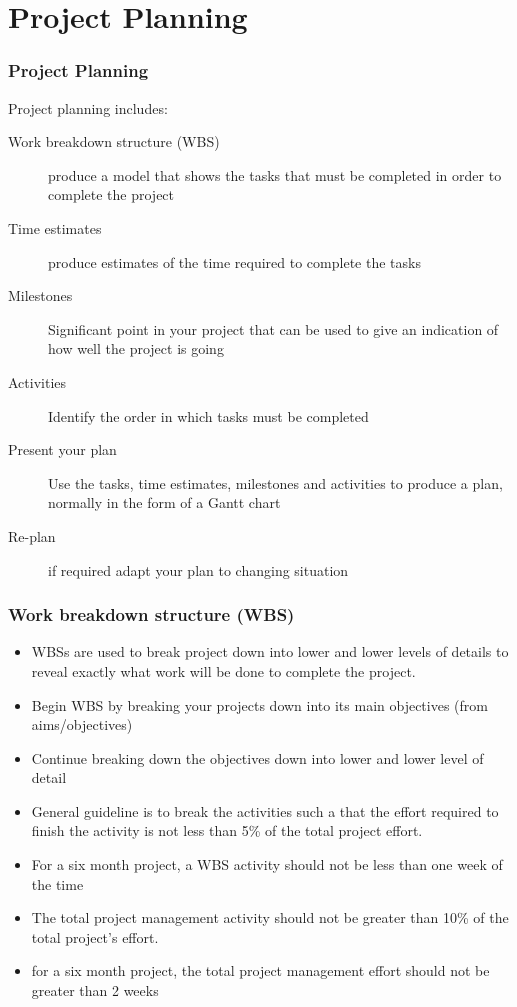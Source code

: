 \section{Project Planning} %
\label{sec:project_planning}
\begin{frame}[t]\frametitle{Project Planning}
Project planning includes:
\begin{description}
    	\item [Work breakdown structure (WBS)] produce a model that shows the tasks that must be completed in order to complete the project
    	\item [Time estimates] produce estimates of the time required to complete the tasks
    	\item [Milestones] Significant point in your project that can be used to give an indication of how well the project is going
    	\item [Activities] Identify the order in which tasks must be completed
    	\item [Present your plan] Use the tasks, time estimates, milestones and activities to produce a plan, normally in the form of a Gantt chart
    	\item [Re-plan] if required adapt your plan to changing situation
    \end{description}
\end{frame}


\begin{frame}[t]\frametitle{Work breakdown structure (WBS)}
\begin{itemize}
    	\item WBSs are used to break project down into lower and lower levels of details to reveal exactly what work will be done to complete the project.
    	\item Begin WBS by breaking your projects down into its main  objectives (from aims/objectives)
    	\item Continue breaking down the objectives down into lower and lower level of detail
    	\item General guideline is to break the activities such a that the effort required to finish the activity is not less than 5\% of the total project effort.
    	\item For a six month project, a WBS activity should not be less than one week of the time
    	\item The total project management activity should not be greater than 10\% of the total project's effort.
    	\item for a six month project, the total project management effort should not be greater than 2 weeks
    \end{itemize}
\end{frame}

